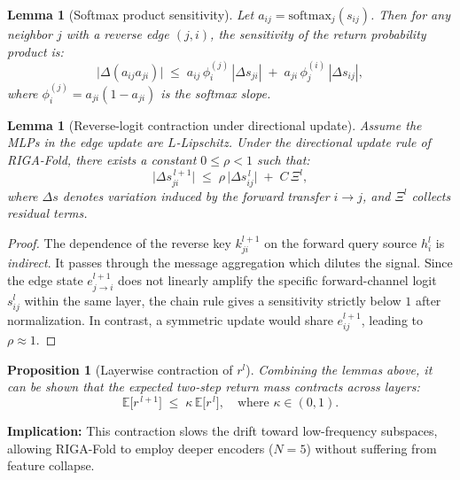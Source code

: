\documentclass{article}
\theoremstyle{plain}
\newtheorem{proposition}[theorem]{Proposition}
\newtheorem{lemma}[theorem]{Lemma}
\theoremstyle{definition}
\theoremstyle{remark}
\begin{document}
{\begin{lemma}[Softmax product sensitivity]
Let $a_{ij}=\mathrm{softmax}_j(s_{ij})$. Then for any neighbor $j$ with a reverse edge $(j,i)$, the sensitivity of the return probability product is:
\begin{equation}
\big|\Delta(a_{ij} a_{ji})\big| 
\;\le\; a_{ij}\, \phi^{(j)}_i\, |\Delta s_{ji}| \;+\; a_{ji}\, \phi^{(i)}_j\, |\Delta s_{ij}|,
\end{equation}
where $\phi^{(j)}_i = a_{ji}(1-a_{ji})$ is the softmax slope.
\end{lemma}

\begin{lemma}[Reverse-logit contraction under directional update]
\label{lem:reverse-contract}
Assume the MLPs in the edge update are $L$-Lipschitz. Under the directional update rule of RIGA-Fold, there exists a constant $0\le \rho<1$ such that:
\begin{equation}
\big| \Delta s_{ji}^{\,l+1} \big| \;\le\; \rho\, \big| \Delta s_{ij}^{\,l} \big| \;+\; C\,\Xi^l,
\end{equation}
where $\Delta s$ denotes variation induced by the forward transfer $i\!\to\!j$, and $\Xi^l$ collects residual terms.
\end{lemma}
\begin{proof}
The dependence of the reverse key $k_{ji}^{l+1}$ on the forward query source $h_i^l$ is \emph{indirect}. It passes through the message aggregation which dilutes the signal. Since the edge state $e_{j\to i}^{l+1}$ does not linearly amplify the specific forward-channel logit $s_{ij}^l$ within the same layer, the chain rule gives a sensitivity strictly below $1$ after normalization. In contrast, a symmetric update would share $e_{ij}^{l+1}$, leading to $\rho \approx 1$.
\end{proof}

\begin{proposition}[Layerwise contraction of $r^l$]
Combining the lemmas above, it can be shown that the expected two-step return mass contracts across layers:
\begin{equation}
\mathbb{E}\!\big[r^{\,l+1}\big] \;\le\; \kappa\,\mathbb{E}\!\big[r^{\,l}\big], \quad \text{where } \kappa \in (0,1).
\end{equation}
\end{proposition}
\textbf{Implication:} This contraction slows the drift toward low-frequency subspaces, allowing RIGA-Fold to employ deeper encoders ($N=5$) without suffering from feature collapse.

}
\end{document}
